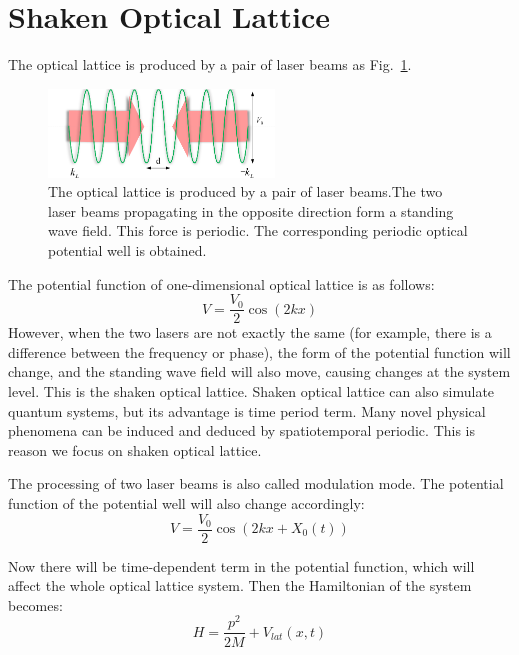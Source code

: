 \documentclass[
 reprint,
 amsmath,amssymb,
 aps,
pra,
floatfix,
]{revtex4-2}
\begin{document}
\section{Shaken Optical Lattice}
The optical lattice is produced by a pair of laser beams as Fig.~\ref{fig1}.
\begin{figure}[b]
  \includegraphics[width = 6cm]{fig1.eps}
  \caption{\label{fig1} The optical lattice is produced by a pair of laser beams.The two laser beams propagating in the opposite direction form a standing wave field. 
  This force is periodic. The corresponding periodic optical potential well is obtained.}
\end{figure}
The potential function of one-dimensional optical lattice is as follows:
\begin{equation}
  V=\frac{V_{0}}{2} \cos (2 k x)
  \label{eq1}
\end{equation}
However, when the two lasers are not exactly the same (for example, there is a difference between the frequency or phase), 
the form of the potential function will change, and the standing wave field will also move, causing changes at the system level.
This is the shaken optical lattice.
Shaken optical lattice can also simulate quantum systems, but its advantage is time period term. 
Many novel physical phenomena can be induced and deduced by spatiotemporal periodic. 
This is reason we focus on shaken optical lattice.

The processing of two laser beams is also called modulation mode. The potential function of the potential well will also change accordingly:
\begin{equation}
  V=\frac{V_{0}}{2} \cos \left(2 k x+X_{0}(t)\right)
  \label{eq2}
\end{equation}

Now there will be time-dependent term in the potential function, which will affect the whole optical lattice system. 
Then the Hamiltonian of the system becomes:
\begin{equation}
  H=\frac{p^{2}}{2 M}+V_{l a t}(x, t)
  \label{eq3}
\end{equation}
\end{document}
